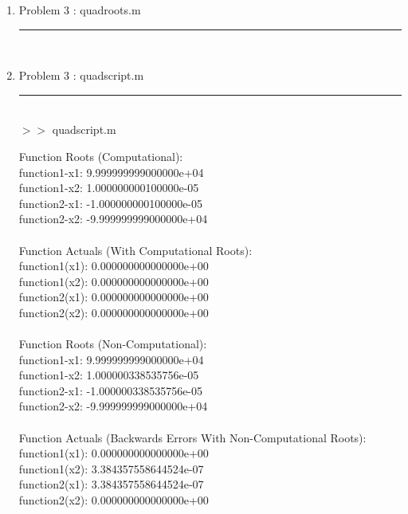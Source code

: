 \documentclass[12pt]{article}
\begin{document}
	\begin{enumerate}
	\item[] Problem 3 : quadroots.m \noindent\rule{\textwidth}{1.0pt} \\
		
	
		\item[] Problem 3 : quadscript.m \noindent\rule{\textwidth}{1.0pt} \\
		
		
	$>>$ quadscript.m
	\begin{framed}
		Function Roots (Computational):\\
function1-x1: 9.999999999000000e+04\\
function1-x2: 1.000000000100000e-05\\
function2-x1: -1.000000000100000e-05\\
function2-x2: -9.999999999000000e+04\\
\\
Function Actuals (With Computational Roots):\\
function1(x1): 0.000000000000000e+00\\
function1(x2): 0.000000000000000e+00\\
function2(x1): 0.000000000000000e+00\\
function2(x2): 0.000000000000000e+00\\
\\
Function Roots (Non-Computational):\\
function1-x1: 9.999999999000000e+04\\
function1-x2: 1.000000338535756e-05\\
function2-x1: -1.000000338535756e-05\\
function2-x2: -9.999999999000000e+04\\
\\
Function Actuals (Backwards Errors With Non-Computational Roots):\\
function1(x1): 0.000000000000000e+00\\
function1(x2): 3.384357558644524e-07\\
function2(x1): 3.384357558644524e-07\\
function2(x2): 0.000000000000000e+00\\
	\end{framed}	
	
	\end{enumerate}
\end{document}
